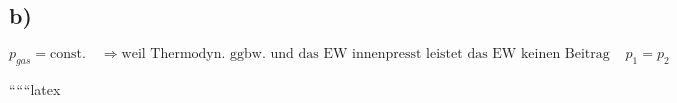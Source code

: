 

\subsection*{b)}

\[
p_{gas} = \text{const.} \quad \Rightarrow \text{weil Thermodyn. ggbw. und das EW innenpresst leistet das EW keinen Beitrag zum Druck, also muss } p_1 = p_2
\]

``````latex